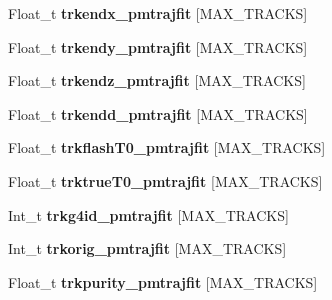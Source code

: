 \begin{DoxyCompactItemize}
\item 
\hypertarget{classanatree_a78a9a7a0943eb654274a22a80ca28e32}{Float\-\_\-t {\bfseries trkendx\-\_\-pmtrajfit} \mbox{[}M\-A\-X\-\_\-\-T\-R\-A\-C\-K\-S\mbox{]}}\label{classanatree_a78a9a7a0943eb654274a22a80ca28e32}

\item 
\hypertarget{classanatree_aa95a52db37ca5f4abd1070ec5ae99a35}{Float\-\_\-t {\bfseries trkendy\-\_\-pmtrajfit} \mbox{[}M\-A\-X\-\_\-\-T\-R\-A\-C\-K\-S\mbox{]}}\label{classanatree_aa95a52db37ca5f4abd1070ec5ae99a35}

\item 
\hypertarget{classanatree_a655cddde7ff2c9ecce9a539d996980be}{Float\-\_\-t {\bfseries trkendz\-\_\-pmtrajfit} \mbox{[}M\-A\-X\-\_\-\-T\-R\-A\-C\-K\-S\mbox{]}}\label{classanatree_a655cddde7ff2c9ecce9a539d996980be}

\item 
\hypertarget{classanatree_a3e0fb36f19136b68a9469c9d4025b0f4}{Float\-\_\-t {\bfseries trkendd\-\_\-pmtrajfit} \mbox{[}M\-A\-X\-\_\-\-T\-R\-A\-C\-K\-S\mbox{]}}\label{classanatree_a3e0fb36f19136b68a9469c9d4025b0f4}

\item 
\hypertarget{classanatree_a748b0c21758252c868608c7eca3224ce}{Float\-\_\-t {\bfseries trkflash\-T0\-\_\-pmtrajfit} \mbox{[}M\-A\-X\-\_\-\-T\-R\-A\-C\-K\-S\mbox{]}}\label{classanatree_a748b0c21758252c868608c7eca3224ce}

\item 
\hypertarget{classanatree_ae6494d9f988552257ca4832ec3a3397a}{Float\-\_\-t {\bfseries trktrue\-T0\-\_\-pmtrajfit} \mbox{[}M\-A\-X\-\_\-\-T\-R\-A\-C\-K\-S\mbox{]}}\label{classanatree_ae6494d9f988552257ca4832ec3a3397a}

\item 
\hypertarget{classanatree_aa38ed08a2ecead6d77295bc1b2e16b61}{Int\-\_\-t {\bfseries trkg4id\-\_\-pmtrajfit} \mbox{[}M\-A\-X\-\_\-\-T\-R\-A\-C\-K\-S\mbox{]}}\label{classanatree_aa38ed08a2ecead6d77295bc1b2e16b61}

\item 
\hypertarget{classanatree_af73683d3cd8d9744249a2e982e8d368e}{Int\-\_\-t {\bfseries trkorig\-\_\-pmtrajfit} \mbox{[}M\-A\-X\-\_\-\-T\-R\-A\-C\-K\-S\mbox{]}}\label{classanatree_af73683d3cd8d9744249a2e982e8d368e}

\item 
\hypertarget{classanatree_ad62e41cc71946eba049a853e9e661d7d}{Float\-\_\-t {\bfseries trkpurity\-\_\-pmtrajfit} \mbox{[}M\-A\-X\-\_\-\-T\-R\-A\-C\-K\-S\mbox{]}}\label{classanatree_ad62e41cc71946eba049a853e9e661d7d}


\end{DoxyCompactItemize}
